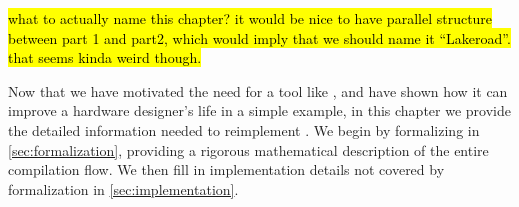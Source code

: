 \hl{what to actually name this chapter? it would be nice to have parallel structure between part 1 and part2, which would imply that we should name it ``Lakeroad''. that seems kinda weird though.}

Now that we have motivated
  the need for a tool like \lr,
  and have shown how it can improve
  a hardware designer's life in a simple example,
  in this chapter
  we provide the detailed information needed
  to reimplement \lr.
We begin by formalizing \lr
  in \cref{sec:formalization},
  providing a rigorous mathematical description
  of the entire compilation flow.
We then fill in implementation details
  not covered by formalization
  in \cref{sec:implementation}.